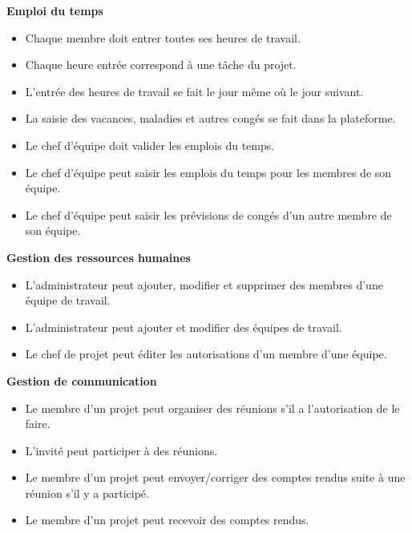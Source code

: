 \par\textbf{Emploi du temps}
\begin{itemize}
    \item 	Chaque membre doit entrer toutes ses heures de travail.
    \item 	Chaque heure entrée correspond à une tâche du projet.
    \item L’entrée des heures de travail se fait le jour même où le jour suivant.
    \item La saisie des vacances, maladies et autres congés se fait dans la plateforme.
    \item 	Le chef d'équipe doit valider les emplois du temps.
    \item 	Le chef d'équipe peut saisir les emplois du temps pour les membres de son équipe.
    \item 	Le chef d'équipe peut saisir les prévisions de congés d'un autre membre de son équipe.
\end{itemize}
\par\textbf{Gestion des ressources humaines}
\begin{itemize}
    \item 	L’administrateur peut ajouter, modifier et supprimer des membres d’une équipe de travail.
    \item 	L’administrateur peut ajouter et modifier des équipes de travail.
    \item Le chef de projet peut éditer les autorisations d'un membre d’une équipe.
\end{itemize}
\par \textbf{Gestion de communication}
\begin{itemize}
    \item 	Le membre d’un projet peut organiser des réunions s'il a l’autorisation de le faire.
    \item 	L’invité peut participer à des réunions.
    \item Le membre d’un projet peut envoyer/corriger des comptes rendus suite à une réunion s’il y a participé.
    \item 	Le membre d’un projet peut recevoir des comptes rendus.
\end{itemize}
